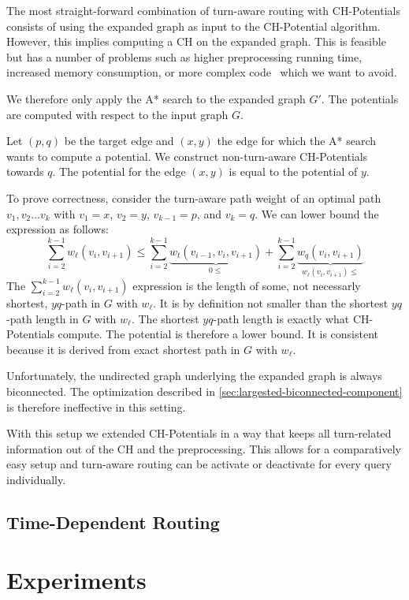 \documentclass[sigconf]{acmart}
\begin{document}
The most straight-forward combination of turn-aware routing with CH-Potentials consists of using the expanded graph as input to the CH-Potential algorithm.
However, this implies computing a CH on the expanded graph.
This is feasible but has a number of problems such as higher preprocessing running time, increased memory consumption, or more complex code~\cite{geisberger-turn-table-paper} which we want to avoid.

We therefore only apply the A* search to the expanded graph $G'$. 
The potentials are computed with respect to the input graph $G$.

Let $(p,q)$ be the target edge and $(x,y)$ the edge for which the A* search wants to compute a potential.
We construct non-turn-aware CH-Potentials towards $q$.
The potential for the edge $(x,y)$ is equal to the potential of $y$.

To prove correctness, consider the turn-aware path weight of an optimal path $v_1,v_2\ldots v_k$ with $v_1=x$, $v_2=y$, $v_{k-1}=p$, and $v_k=q$.
We can lower bound the expression as follows:
\[
\sum_{i=2}^{k-1} w_\ell(v_i,v_{i+1}) \le \sum_{i=2}^{k-1} \underbrace{w_t(v_{i-1},v_i,v_{i+1})}_{0\le} + \sum_{i=2}^{k-1} \underbrace{w_q(v_i,v_{i+1})}_{w_\ell(v_i,v_{i+1})\le}
\]
The $\sum_{i=2}^{k-1} w_\ell(v_i,v_{i+1})$ expression is the length of some, not necessarly shortest, $yq$-path in $G$ with $w_\ell$.
It is by definition not smaller than the shortest $yq$-path length in $G$ with $w_\ell$.
The shortest $yq$-path length is exactly what CH-Potentials compute.
The potential is therefore a lower bound.
It is consistent because it is derived from exact shortest path in $G$ with $w_\ell$.

Unfortunately, the undirected graph underlying the expanded graph is always biconnected.
The optimization described in \ref{sec:largested-biconnected-component} is therefore ineffective in this setting.

With this setup we extended CH-Potentials in a way that keeps all turn-related information out of the CH and the preprocessing.
This allows for a comparatively easy setup and turn-aware routing can be activate or deactivate for every query individually.

\subsection{Time-Dependent Routing}


\section{Experiments}
\end{document}
